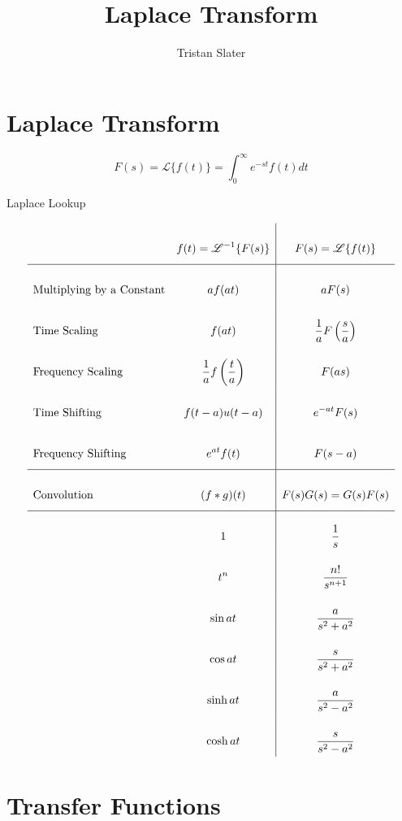 \documentclass{article}
\title{Laplace Transform}
\author{Tristan Slater}
\begin{document}
    \maketitle
    
    \section{Laplace Transform}

    \begin{equation}
        F(s) = \mathscr{L}\{f(t)\} = \int_0^\infty{e^{-st} f(t) dt}
    \end{equation}

    \begin{table}[h]
        \centering
        \caption{Laplace Lookup}
        $$\def\arraystretch{3}
        \begin{array}{>$l<$>{\displaystyle}c|>{\displaystyle}c}
            & f(t) = \mathscr{L}^{-1}\{F(s)\} & F(s) = \mathscr{L}\{f(t)\} \\
            \hline
            Multiplying by a Constant & af(at) & aF(s) \\
            Time Scaling & f(at) & \frac{1}{a}F\left(\frac{s}{a}\right) \\
            Frequency Scaling & \frac{1}{a}f\left(\frac{t}{a}\right) & F(as) \\
            Time Shifting & f(t - a)u(t - a) & e^{-at}F(s) \\
            Frequency Shifting & e^{at} f(t) & F(s - a) \\
            \hline
            Convolution & (f * g)(t) & F(s)G(s) = G(s)F(s) \\
            \hline
            & 1 & \frac{1}{s} \\
            & t^n & \frac{n!}{s^{n + 1}} \\
            & \sin{at} & \frac{a}{s^2 + a^2} \\
            & \cos{at} & \frac{s}{s^2 + a^2} \\
            & \sinh{at} & \frac{a}{s^2 - a^2} \\
            & \cosh{at} & \frac{s}{s^2 - a^2} \\
        \end{array}$$
    \end{table}

    \section{Transfer Functions}
\end{document}
